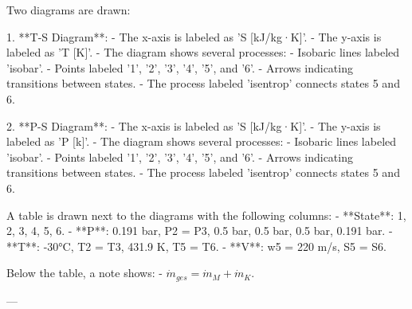 Two diagrams are drawn:  

1. **T-S Diagram**:  
   - The x-axis is labeled as 'S [kJ/kg·K]'.  
   - The y-axis is labeled as 'T [K]'.  
   - The diagram shows several processes:  
     - Isobaric lines labeled 'isobar'.  
     - Points labeled '1', '2', '3', '4', '5', and '6'.  
     - Arrows indicating transitions between states.  
     - The process labeled 'isentrop' connects states 5 and 6.  

2. **P-S Diagram**:  
   - The x-axis is labeled as 'S [kJ/kg·K]'.  
   - The y-axis is labeled as 'P [k]'.  
   - The diagram shows several processes:  
     - Isobaric lines labeled 'isobar'.  
     - Points labeled '1', '2', '3', '4', '5', and '6'.  
     - Arrows indicating transitions between states.  
     - The process labeled 'isentrop' connects states 5 and 6.  

A table is drawn next to the diagrams with the following columns:  
- **State**: 1, 2, 3, 4, 5, 6.  
- **P**: 0.191 bar, P2 = P3, 0.5 bar, 0.5 bar, 0.5 bar, 0.191 bar.  
- **T**: -30°C, T2 = T3, 431.9 K, T5 = T6.  
- **V**: w5 = 220 m/s, S5 = S6.  

Below the table, a note shows:  
- \( \dot{m}_{ges} = \dot{m}_M + \dot{m}_K \).  

---